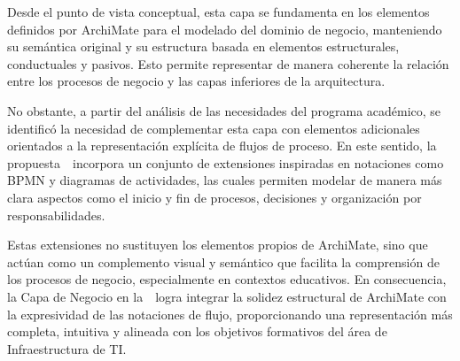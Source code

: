 Desde el punto de vista conceptual, esta capa se fundamenta en los elementos definidos por ArchiMate para el modelado del dominio de negocio, manteniendo su semántica original y su estructura basada en elementos estructurales, conductuales y pasivos. Esto permite representar de manera coherente la relación entre los procesos de negocio y las capas inferiores de la arquitectura.

No obstante, a partir del análisis de las necesidades del programa académico, se identificó la necesidad de complementar esta capa con elementos adicionales orientados a la representación explícita de flujos de proceso. En este sentido, la propuesta~\NDITI~incorpora un conjunto de extensiones inspiradas en notaciones como BPMN y diagramas de actividades, las cuales permiten modelar de manera más clara aspectos como el inicio y fin de procesos, decisiones y organización por responsabilidades.

Estas extensiones no sustituyen los elementos propios de ArchiMate, sino que actúan como un complemento visual y semántico que facilita la comprensión de los procesos de negocio, especialmente en contextos educativos. En consecuencia, la Capa de Negocio en la~\NDITI~logra integrar la solidez estructural de ArchiMate con la expresividad de las notaciones de flujo, proporcionando una representación más completa, intuitiva y alineada con los objetivos formativos del área de Infraestructura de TI.

\renewcommand{\arraystretch}{1.3}
\setlength{\extrarowheight}{2pt}
\fontsize{8.5pt}{10pt}\selectfont

